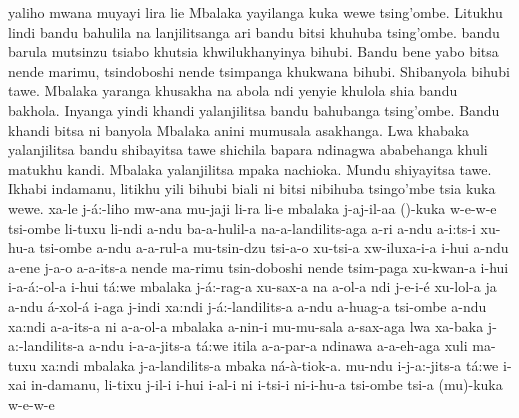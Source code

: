  {yaliho} {mwana} {muyayi} {lira} {lie} {Mbalaka} {yayilanga} {kuka} {wewe} {tsing’ombe.} {Litukhu} {lindi} {bandu} {bahulila} {na lanjilitsanga} {ari} {bandu} {bitsi} {khuhuba} {tsing’ombe.} {bandu} {barula} {mutsinzu} {tsiabo} {khutsia} {khwilukhanyinya} {bihubi.} {Bandu} {bene} {yabo} {bitsa} {nende} {marimu,} {tsindoboshi} {nende} {tsimpanga} {khukwana} {bihubi.} {Shibanyola} {bihubi} {tawe.} {Mbalaka} {yaranga} {khusakha} {na} {abola} {ndi} {yenyie} {khulola} {shia} {bandu} {bakhola.} {Inyanga} {yindi} {khandi} {yalanjilitsa} {bandu} {bahubanga} {tsing’ombe.} {Bandu} {khandi} {bitsa} {ni} {banyola} {Mbalaka} {anini} {mumusala} {asakhanga.} {Lwa} {khabaka} {yalanjilitsa} {bandu} {shibayitsa} {tawe} {shichila} {bapara} {ndinagwa} {ababehanga} {khuli} {matukhu} {kandi.} {Mbalaka} {yalanjilitsa} {mpaka} {nachioka.} {Mundu} {shiyayitsa} {tawe.} {Ikhabi} {indamanu,} {litikhu} {yili} {bihubi} {biali} {ni} {bitsi} {nibihuba} {tsingo’mbe} {tsia} {kuka} {wewe.}
{xa-le} {j-\'a:-liho} {mw-ana} {mu-jaji} {li-ra} {li-e} {mbalaka} {j-aj-il-a\engma{}a} {()-kuka} {w-e-w-e} {tsi\engma{}-ombe} {li-tuxu} {li-ndi} {\beta{}a-ndu} {ba-a-hulil-a} {na-a-land\ezh{}ilits-a\engma{}ga} {a-ri} {\beta{}a-ndu} {\beta{}a-i:ts-i} {xu-hu\beta{}-a} {tsi\engma{}-ombe} {\beta{}a-ndu} {\beta{}a-a-rul-a} {mu-tsin-dzu} {tsi-a-\beta{}o} {xu-tsi-a} {xw-iluxa-\palnas{}i\palnas{}-a} {\beta{}i-hu\beta{}i} {\beta{}a-ndu} {\beta{}a-ene} {j-a\beta{}-o} {\beta{}a-a-its-a} {nende} {ma-rimu} {tsin-doboshi} {nende} {tsim-pa\engma{}ga} {xu-kwan-a} {\beta{}i-hu\beta{}i} {\esh{}i-\beta{}a-\'a:-\palnas{}ol-a} {\beta{}i-hu\beta{}i} {t\'a:we} {mbalaka} {j-\'a:-ra\engma{}g-a} {xu-sax-a} {na} {a-\beta{}ol-a} {ndi} {j-e\palnas{}-i-\'e} {xu-lol-a} {\esh{}ja} {\beta{}a-ndu} {\beta{}\'a-xol-\'a} {i-\palnas{}a\engma{}ga} {j-indi} {xa:ndi} {j-\'a:-land\ezh{}ilits-a} {\beta{}a-ndu} {\beta{}a-hu\beta{}a\engma{}g-a} {tsi\engma{}-ombe} {\beta{}a-ndu} {xa:ndi} {\beta{}a-a-its-a} {ni} {\beta{}a-a-\palnas{}ol-a} {mbalaka} {a-nin-i} {mu-mu-sala} {a-sax-a\engma{}ga} {lwa} {xa-baka} {j-a:-land\ezh{}ilits-a} {\beta{}a-ndu} {\esh{}i-\beta{}a-a-jits-a} {t\'a:we} {\esh{}it\esh{}ila} {\beta{}a-a-par-a} {ndina\engma{}wa} {a-\beta{}a-\beta{}eh-a\engma{}ga} {xuli} {ma-tuxu} {xa:ndi} {mbalaka} {j-a-land\ezh{}ilits-a} {mbaka} {n\'{a}-\`a-t\esh{}iok-a.} {mu-ndu} {\esh{}i-j-a:-jits-a} {t\'a:we} {i-xa\beta{}i} {in-damanu,} {li-tixu} {j-il-i} {\beta{}i-hu\beta{}i} {\beta{}i-al-i} {ni} {\beta{}i-tsi-i} {ni-\beta{}i-hu\beta{}-a} {tsi\engma{}-ombe} {tsi-a} {(mu)-kuka} {w-e-w-e}
